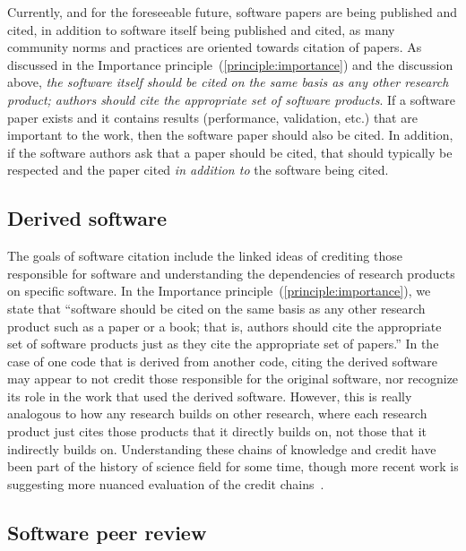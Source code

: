 \documentclass[12pt, oneside]{amsart}
\begin{document}
Currently, and for the foreseeable future, software papers are being published and cited,
in addition to software itself being published and cited, as many community norms and practices are
oriented towards citation of papers.
As discussed in the Importance principle~(\ref{principle:importance}) and the discussion above, \textit{the software
itself should be cited on the same basis as any other research product; authors should cite the appropriate set of software products}.
If a software paper exists and it contains results (performance, validation, etc.) that are
important to the work, then the software paper should also be cited.
In addition, if the software authors ask that a paper should be cited, that should typically be respected and the paper cited \textit{in addition to} the software being cited.

\subsection{Derived software}

The goals of software citation include the linked ideas of crediting those responsible for software and understanding the dependencies of research products on specific software.
In the Importance principle~(\ref{principle:importance}), we state that
``software should be cited on the same basis as any other research product such as a paper or a book; that is, authors should cite the appropriate set of software products just as they cite the appropriate set of papers.''
In the case of one code that is derived from another code, citing the derived software may appear to not credit those responsible for the original software, nor recognize its role in the work that used the derived software.
However, this is really analogous to how any research builds on other research, where each research product just cites those products that it directly builds on, not those that it indirectly builds on.
Understanding these chains of knowledge and credit have been part of the history of science field for some time, though more recent work is suggesting more nuanced evaluation of the credit chains~\cite{casrai-credit, transitive_credit_json-ld}.

\subsection{Software peer review}
\end{document}
